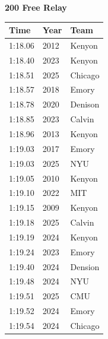 \noindent\begin{minipage}[t]{0.98\textwidth}
\centering
\textbf{\textcolor{teamprimary}{200 Free Relay}}\par
\vspace{0.5em}
\centering
\small
\renewcommand{\arraystretch}{1.0}
\setlength{\tabcolsep}{4pt}
\begin{tabular}{@{}p{4.5cm}p{2.5cm}p{4.5cm}@{}}
\toprule
\textbf{Time} & \textbf{Year} & \textbf{Team} \\
\midrule
1:18.06 & 2012 & Kenyon \\
1:18.40 & 2023 & Kenyon \\
1:18.51 & 2025 & Chicago \\
1:18.57 & 2018 & Emory \\
1:18.78 & 2020 & Denison \\
1:18.85 & 2023 & Calvin \\
1:18.96 & 2013 & Kenyon \\
1:19.03 & 2017 & Emory \\
1:19.03 & 2025 & NYU \\
1:19.05 & 2010 & Kenyon \\
1:19.10 & 2022 & MIT \\
1:19.15 & 2009 & Kenyon \\
1:19.18 & 2025 & Calvin \\
1:19.19 & 2024 & Kenyon \\
1:19.24 & 2023 & Emory \\
1:19.40 & 2024 & Dension \\
1:19.48 & 2024 & NYU \\
1:19.51 & 2025 & CMU \\
1:19.52 & 2024 & Emory \\
1:19.54 & 2024 & Chicago \\
\bottomrule
\end{tabular}
\end{minipage}
\vspace{1.2em}
